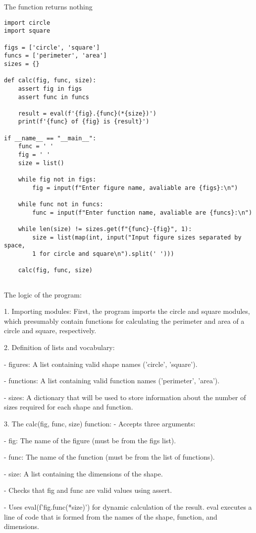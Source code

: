 \documentclass[12pt]{article}
\begin{document}
    The function returns nothing
\begin{verbatim}
import circle
import square

figs = ['circle', 'square']
funcs = ['perimeter', 'area']
sizes = {}

def calc(fig, func, size):
    assert fig in figs
    assert func in funcs

    result = eval(f'{fig}.{func}(*{size})')
    print(f'{func} of {fig} is {result}')

if __name__ == "__main__":
    func = ' '
    fig = ' '
    size = list()
    
    while fig not in figs:
        fig = input(f"Enter figure name, avaliable are {figs}:\n")
    
    while func not in funcs:
        func = input(f"Enter function name, avaliable are {funcs}:\n")
    
    while len(size) != sizes.get(f"{func}-{fig}", 1):
        size = list(map(int, input("Input figure sizes separated by space, 
        1 for circle and square\n").split(' ')))
    
    calc(fig, func, size)
    
\end{verbatim}
The logic of the program:

1. Importing modules: First, the program imports the circle and square modules, which presumably contain functions for calculating the perimeter and area of a circle and square, respectively.

2. Definition of lists and vocabulary:

 - figures: A list containing valid shape names ('circle', 'square').
 
 - functions: A list containing valid function names ('perimeter', 'area').
 
 - sizes: A dictionary that will be used to store information about the number of sizes required for each shape and function.

3. The calc(fig, func, size) function:
- Accepts three arguments:

 - fig: The name of the figure (must be from the figs list).
 
 - func: The name of the function (must be from the list of functions).
 
 - size: A list containing the dimensions of the shape.
 
 - Checks that fig and func are valid values using assert.
 
 - Uses eval(f'{fig}.{func}(*{size})') for dynamic calculation of the result. eval executes a line of code that is formed from the names of the shape, function, and dimensions.
\end{document}
